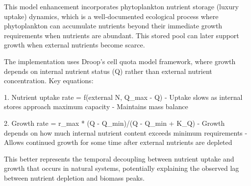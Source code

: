 This model enhancement incorporates phytoplankton nutrient storage (luxury uptake) dynamics, which is a well-documented ecological process where phytoplankton can accumulate nutrients beyond their immediate growth requirements when nutrients are abundant. This stored pool can later support growth when external nutrients become scarce.

The implementation uses Droop's cell quota model framework, where growth depends on internal nutrient status (Q) rather than external nutrient concentration. Key equations:

1. Nutrient uptake rate = f(external N, Q_max - Q) 
   - Uptake slows as internal stores approach maximum capacity
   - Maintains mass balance

2. Growth rate = r_max * (Q - Q_min)/(Q - Q_min + K_Q)
   - Growth depends on how much internal nutrient content exceeds minimum requirements
   - Allows continued growth for some time after external nutrients are depleted

This better represents the temporal decoupling between nutrient uptake and growth that occurs in natural systems, potentially explaining the observed lag between nutrient depletion and biomass peaks.
